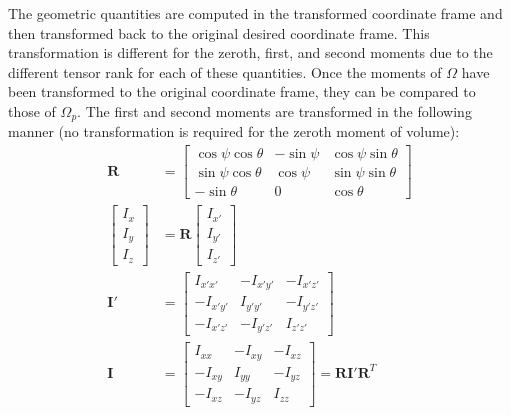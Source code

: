 The geometric quantities are computed in the transformed coordinate frame and then transformed back to the original desired coordinate frame. This transformation is different for the zeroth, first, and second moments due to the different tensor rank for each of these quantities. Once the moments of $\Omega$ have been transformed to the original coordinate frame, they can be compared to those of $\Omega_p$. The first and second moments are transformed in the following manner (no transformation is required for the zeroth moment of volume):
\begin{align}
\bm{R} &= \left[\begin{array} {ccc} {\cos\psi\cos\theta} & {-\sin\psi} & {\cos\psi\sin\theta}\\ {\sin\psi\cos\theta} & {\cos\psi} & {\sin\psi\sin\theta} \\
{-\sin\theta} & {0} & {\cos\theta}\end{array} \right] \\
\left[\begin{array} {ccc} {I_x} \\ {I_y} \\ {I_z} \end{array} \right] &= \bm{R} \left[\begin{array} {ccc} {I_{x'}} \\ {I_{y'}} \\ {I_{z'}} \end{array} \right]\\
\bm{I}' &= \left[\begin{array} {ccc} {I_{x'x'}} & {-I_{x'y'}} & {-I_{x'z'}}\\ {-I_{x'y'}} & {I_{y'y'}} & {-I_{y'z'}} \\ -{I_{x'z'}} & {-I_{y'z'}} & {I_{z'z'}} \end{array} \right] \\
\bm{I} &= \left[\begin{array} {ccc} {I_{xx}} & {-I_{xy}} & {-I_{xz}}\\ {-I_{xy}} & {I_{yy}} & {-I_{yz}} \\ -{I_{xz}} & {-I_{yz}} & {I_{zz}} \end{array} \right] = \bm{R}\bm{I}'\mathbf{R}^T
\end{align}

